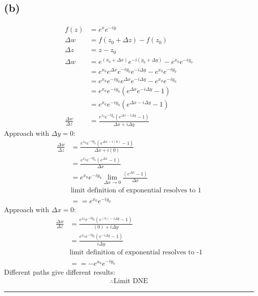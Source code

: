 \documentclass{article}
\begin{document}
\subsection*{(b)}
\begin{align*}
  f(z) &= e^{x}e^{-iy}\\
  \Delta w &= f(z_0 + \Delta z) - f(z_0) \\
  \Delta z &= z - z_0\\
  \Delta w &=e^{(x_0+\Delta x)}e^{-i(y_0+\Delta y)} - e^{x_0}e^{-iy_0} \\
       &=e^{x_0}e^{\Delta x}e^{-iy_0}e^{-i\Delta y} - e^{x_0}e^{-iy_0} \\
       &=e^{x_0}e^{-iy_0}e^{\Delta x}e^{-i\Delta y} - e^{x_0}e^{-iy_0} \\
       &=e^{x_0}e^{-iy_0}(e^{\Delta x}e^{-i\Delta y} - 1) \\
       &=e^{x_0}e^{-iy_0}(e^{\Delta x-i\Delta y} - 1) \\
 \frac{\Delta w}{\Delta z} &=\frac{e^{x_0}e^{-iy_0}(e^{\Delta x-i\Delta y} - 1)}{\Delta x + i\Delta y}
\end{align*}
Approach with $\Delta y = 0$:
\begin{align*}
  \frac{\Delta w}{\Delta z}&= \frac{e^{x_0}e^{-iy_0}(e^{\Delta x-i(0)} - 1)}{\Delta x + i(0)} \\
                           &= \frac{e^{x_0}e^{-iy_0}(e^{\Delta x} - 1)}{\Delta x} \\
                           &= e^{x_0}e^{-iy_0}\lim\limits_{\Delta x \to 0}\frac{(e^{\Delta x} - 1)}{\Delta x} \\
                           &\text{limit definition of exponential resolves to 1}\\
                           &= = e^{x_0}e^{-iy_0}
\end{align*}
Approach with $\Delta x = 0$:
\begin{align*}
  \frac{\Delta w}{\Delta z}&= \frac{e^{x_0}e^{-iy_0}(e^{(0)-i\Delta y} - 1)}{(0) + i\Delta y} \\
                           &= \frac{e^{x_0}e^{-iy_0}(e^{-i\Delta y} - 1)}{i\Delta y} \\
                           &\text{limit definition of exponential resolves to -1}\\
                           &= = -e^{x_0}e^{-iy_0}
\end{align*}
Different paths give different results:
\begin{align*}
  \therefore \text{Limit DNE}
\end{align*}
\vspace{.5cm} %
\hrule
\end{document}
